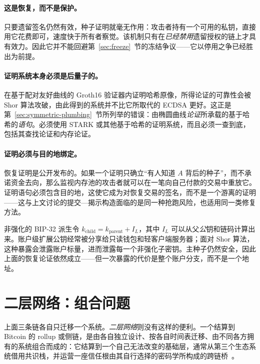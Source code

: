 \paragraph{这是恢复，而不是保护。}
只要遗留签名仍然有效，种子证明就毫无作用：攻击者持有一个可用的私钥，直接用它花费即可，速度快于所有者察觉。该机制只有在\emph{已经禁用}遗留授权的链上才具有效力。因此它并不能回避第~\ref{sec:freeze}~节的冻结争议——它以停用之争已经胜出为前提。

\paragraph{证明系统本身必须是后量子的。}
在基于配对友好曲线的 Groth16 验证器内证明哈希原像，所得论证的可靠性会被 Shor 算法攻破，由此得到的系统并不比它所取代的 ECDSA 更好。这正是第~\ref{sec:symmetric-plumbing}~节所列举的错误：由椭圆曲线\emph{论证}所承载的基于哈希的\emph{语句}。必须使用 STARK 或其他基于哈希的证明系统，而且必须一查到底，包括其查找论证和内存论证。

\paragraph{证明必须与目的地绑定。}
恢复证明是公开发布的。如果一个证明只确立“有人知道 $A$ 背后的种子”，而不承诺资金去向，那么监视内存池的攻击者就可以在一笔向自己付款的交易中重放它。证明语句必须包含目的地，这使它成为对恢复交易的签名，而不是一个游离的证明——这与上文讨论的提交—揭示构造面临的是同一种抢跑风险，也适用同一类修复方法。

\begin{remark}
非强化的 BIP-32 派生令 $k_{\text{child}} = k_{\text{parent}} + I_L$，其中 $I_L$ 可以从父\emph{公}钥和链码计算出来。账户级扩展公钥经常被分享给只读钱包和轻客户端服务器；面对 Shor 算法，这种暴露会泄露账户标量，进而泄露每一个非强化子密钥。主种子仍然安全，因此上面的恢复论证依然成立——但一次暴露的代价是整个账户分支，而不是一个地址。
\end{remark}

\section{二层网络：组合问题}
\label{sec:l2-composition}

上面三条链各自只迁移一个系统。\emph{二层网络}则没有这样的便利。一个结算到 Bitcoin 的 rollup 或侧链，是由各自独立设计、按各自时间表迁移、由不同各方拥有的系统组合而成的：它结算到一个自己无法改变的基础层，通常从第三个生态系统借用共识栈，并运营一座信任根由其自行选择的密码学所构成的跨链桥~\cite{btcl2pqc}。

